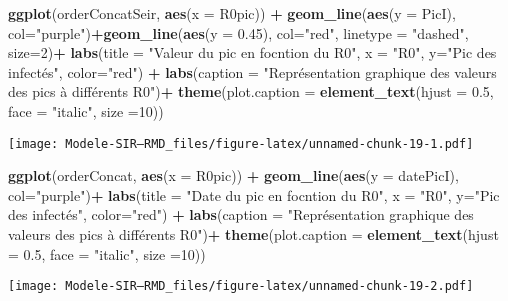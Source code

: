 \documentclass[
]{article}
\newenvironment{Shaded}{\begin{snugshade}}{\end{snugshade}}
\newcommand{\DataTypeTok}[1]{\textcolor[rgb]{0.13,0.29,0.53}{#1}}
\newcommand{\DecValTok}[1]{\textcolor[rgb]{0.00,0.00,0.81}{#1}}
\newcommand{\FloatTok}[1]{\textcolor[rgb]{0.00,0.00,0.81}{#1}}
\newcommand{\KeywordTok}[1]{\textcolor[rgb]{0.13,0.29,0.53}{\textbf{#1}}}
\newcommand{\NormalTok}[1]{#1}
\newcommand{\OperatorTok}[1]{\textcolor[rgb]{0.81,0.36,0.00}{\textbf{#1}}}
\newcommand{\StringTok}[1]{\textcolor[rgb]{0.31,0.60,0.02}{#1}}
\begin{document}
\begin{Shaded}
\begin{Highlighting}[]
\KeywordTok{ggplot}\NormalTok{(orderConcatSeir, }\KeywordTok{aes}\NormalTok{(}\DataTypeTok{x =}\NormalTok{ R0pic)) }\OperatorTok{+}\StringTok{ }\KeywordTok{geom_line}\NormalTok{(}\KeywordTok{aes}\NormalTok{(}\DataTypeTok{y =}\NormalTok{ PicI), }\DataTypeTok{col=}\StringTok{"purple"}\NormalTok{)}\OperatorTok{+}\KeywordTok{geom_line}\NormalTok{(}\KeywordTok{aes}\NormalTok{(}\DataTypeTok{y =} \FloatTok{0.45}\NormalTok{), }\DataTypeTok{col=}\StringTok{"red"}\NormalTok{, }\DataTypeTok{linetype =} \StringTok{"dashed"}\NormalTok{, }\DataTypeTok{size=}\DecValTok{2}\NormalTok{)}\OperatorTok{+}\StringTok{ }\KeywordTok{labs}\NormalTok{(}\DataTypeTok{title =} \StringTok{"Valeur du pic en focntion du R0"}\NormalTok{, }\DataTypeTok{x =} \StringTok{"R0"}\NormalTok{, }\DataTypeTok{y=}\StringTok{"Pic des infectés"}\NormalTok{, }\DataTypeTok{color=}\StringTok{"red"}\NormalTok{) }\OperatorTok{+}\StringTok{ }\KeywordTok{labs}\NormalTok{(}\DataTypeTok{caption =} \StringTok{"Représentation graphique des valeurs des pics à différents R0"}\NormalTok{)}\OperatorTok{+}\StringTok{ }\KeywordTok{theme}\NormalTok{(}\DataTypeTok{plot.caption =} \KeywordTok{element_text}\NormalTok{(}\DataTypeTok{hjust =} \FloatTok{0.5}\NormalTok{, }\DataTypeTok{face =} \StringTok{"italic"}\NormalTok{, }\DataTypeTok{size =}\DecValTok{10}\NormalTok{))}
\end{Highlighting}
\end{Shaded}

\texttt{[image: Modele-SIR---RMD\_files/figure-latex/unnamed-chunk-19-1.pdf]}

\begin{Shaded}
\begin{Highlighting}[]
 \KeywordTok{ggplot}\NormalTok{(orderConcat, }\KeywordTok{aes}\NormalTok{(}\DataTypeTok{x =}\NormalTok{ R0pic)) }\OperatorTok{+}\StringTok{ }\KeywordTok{geom_line}\NormalTok{(}\KeywordTok{aes}\NormalTok{(}\DataTypeTok{y =}\NormalTok{ datePicI), }\DataTypeTok{col=}\StringTok{"purple"}\NormalTok{)}\OperatorTok{+}\StringTok{ }\KeywordTok{labs}\NormalTok{(}\DataTypeTok{title =} \StringTok{"Date du pic en focntion du R0"}\NormalTok{, }\DataTypeTok{x =} \StringTok{"R0"}\NormalTok{, }\DataTypeTok{y=}\StringTok{"Pic des infectés"}\NormalTok{, }\DataTypeTok{color=}\StringTok{"red"}\NormalTok{) }\OperatorTok{+}\StringTok{ }\KeywordTok{labs}\NormalTok{(}\DataTypeTok{caption =} \StringTok{"Représentation graphique des valeurs des pics à différents R0"}\NormalTok{)}\OperatorTok{+}\StringTok{ }\KeywordTok{theme}\NormalTok{(}\DataTypeTok{plot.caption =} \KeywordTok{element_text}\NormalTok{(}\DataTypeTok{hjust =} \FloatTok{0.5}\NormalTok{, }\DataTypeTok{face =} \StringTok{"italic"}\NormalTok{, }\DataTypeTok{size =}\DecValTok{10}\NormalTok{))}
\end{Highlighting}
\end{Shaded}

\texttt{[image: Modele-SIR---RMD\_files/figure-latex/unnamed-chunk-19-2.pdf]}
\end{document}
